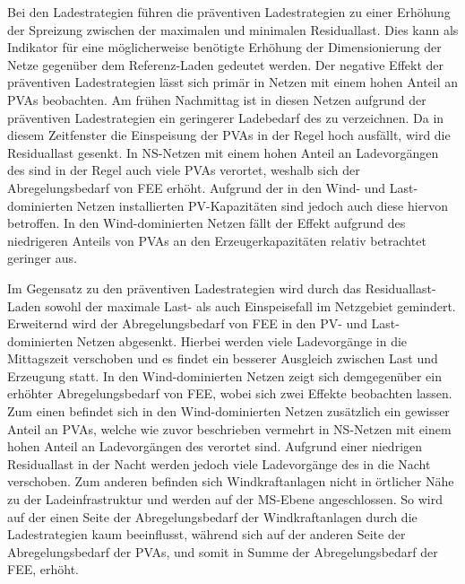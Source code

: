 Bei den Ladestrategien führen die präventiven Ladestrategien zu einer Erhöhung der Spreizung zwischen der maximalen und minimalen Residuallast.
Dies kann als Indikator für eine möglicherweise benötigte Erhöhung der Dimensionierung der Netze gegenüber dem Referenz-Laden gedeutet werden.
Der negative Effekt der präventiven Ladestrategien lässt sich primär in Netzen mit einem hohen Anteil an \glspl{PVA} beobachten.
Am frühen Nachmittag ist in diesen Netzen aufgrund der präventiven Ladestrategien ein geringerer Ladebedarf des \UC \zH zu verzeichnen.
Da in diesem Zeitfenster die Einspeisung der \glspl{PVA} in der Regel hoch ausfällt, wird die Residuallast gesenkt.
In \gls{NS}-Netzen mit einem hohen Anteil an Ladevorgängen des \UC \zH sind in der Regel auch viele \glspl{PVA} verortet, weshalb sich der Abregelungsbedarf von \gls{FEE} erhöht.
Aufgrund der in den Wind- und Last-dominierten Netzen installierten \gls{PV}-Kapazitäten sind jedoch auch diese hiervon betroffen.
In den Wind-dominierten Netzen fällt der Effekt aufgrund des niedrigeren Anteils von \glspl{PVA} an den Erzeugerkapazitäten relativ betrachtet geringer aus.\medskip

Im Gegensatz zu den präventiven Ladestrategien wird durch das Residuallast-Laden sowohl der maximale Last- als auch Einspeisefall im Netzgebiet gemindert.
Erweiternd wird der Abregelungsbedarf von \gls{FEE} in den \gls{PV}- und Last-dominierten Netzen abgesenkt.
Hierbei werden viele Ladevorgänge in die Mittagszeit verschoben und es findet ein besserer Ausgleich zwischen Last und Erzeugung statt.
In den Wind-dominierten Netzen zeigt sich demgegenüber ein erhöhter Abregelungsbedarf von \gls{FEE}, wobei sich zwei Effekte beobachten lassen.
Zum einen befindet sich in den Wind-dominierten Netzen zusätzlich ein gewisser Anteil an \glspl{PVA}, welche wie zuvor beschrieben vermehrt in \gls{NS}-Netzen mit einem hohen Anteil an Ladevorgängen des \UC \zH verortet sind.
Aufgrund einer niedrigen Residuallast in der Nacht werden jedoch viele Ladevorgänge des \UC \zH in die Nacht verschoben.
Zum anderen befinden sich Windkraftanlagen nicht in örtlicher Nähe zu der Ladeinfrastruktur und werden auf der \gls{MS}-Ebene angeschlossen.
So wird auf der einen Seite der Abregelungsbedarf der Windkraftanlagen durch die Ladestrategien kaum beeinflusst, während sich auf der anderen Seite der Abregelungsbedarf der \glspl{PVA}, und somit in Summe der Abregelungsbedarf der \gls{FEE}, erhöht.\medskip

